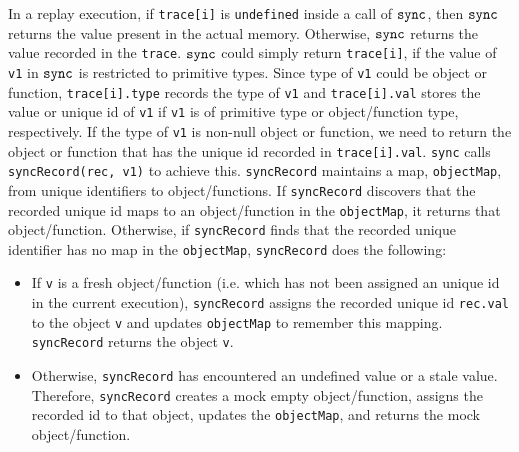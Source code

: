 \documentclass{sig-alternate}
\newcommand \dsl [1] {\ensuremath{{\tt #1}}\xspace}
\newcommand \Sync{\dsl{sync}}
\begin{document}
In a replay execution, if \texttt{trace[i]} is \texttt{undefined}
inside a call of $\Sync$, then $\Sync$ returns the value present in
the actual memory.  Otherwise, $\Sync$ returns the value recorded in
the \texttt{trace}.  $\Sync$ could simply return \texttt{trace[i]}, if
the value of \texttt{v1} in $\Sync$ is restricted to primitive types.
Since type of \texttt{v1} could be object or function,
\texttt{trace[i].type} records the type of \texttt{v1} and
\texttt{trace[i].val} stores the value or unique id of \texttt{v1} if
\texttt{v1} is of primitive type or object/function type,
respectively.  If the type of \texttt{v1} is non-null object or
function, we need to return the object or function that has the unique
id recorded in \texttt{trace[i].val}.  \texttt{sync} calls
\texttt{syncRecord(rec, v1)} to achieve this.  \texttt{syncRecord}
maintains a map, \texttt{objectMap}, from unique identifiers to
object/functions.  If \texttt{syncRecord} discovers that the recorded
unique id maps to an object/function in the \texttt{objectMap}, it
returns that object/function.  Otherwise, if \texttt{syncRecord} finds
that the recorded unique identifier has no map in the
\texttt{objectMap}, \texttt{syncRecord} does the following:
\begin{itemize}
\item If \texttt{v} is a fresh object/function (i.e. which has not
  been assigned an unique id in the current execution),
  \texttt{syncRecord} assigns the recorded unique id \texttt{rec.val}
  to the object \texttt{v} and updates \texttt{objectMap} to remember
  this mapping.  \texttt{syncRecord} returns the object \texttt{v}.
\item Otherwise, \texttt{syncRecord} has encountered an undefined
  value or a stale value.  Therefore, \texttt{syncRecord} creates a
  mock empty object/function, assigns the recorded id to that object,
  updates the \texttt{objectMap}, and returns the mock
  object/function.
\end{itemize}
\end{document}
